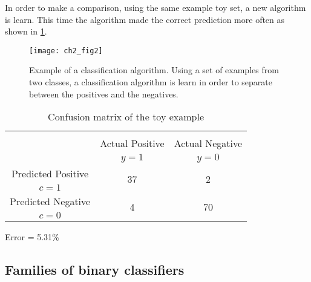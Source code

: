 	In order to make a comparison, using the same example toy set, a new algorithm is learn. This 
time the algorithm made the correct prediction more often as shown in \figurename{ \ref{fig:ch2:2}}.

\begin{figure}[t!]
	\centering
	\texttt{[image: ch2\_fig2]}
	\caption{Example of a classification algorithm. Using a set of examples from two classes, a 
	classification algorithm is learn in order to separate between the positives and the negatives. }
	\label{fig:ch2:2}
\end{figure}

    	\begin{table}[!t]
		\centering
		\footnotesize
    \begin{tabular}{c|c|c}
      \multicolumn{3}{c}{}\\
			\multicolumn{1}{c|}{}  & Actual Positive& Actual Negative \\
			\multicolumn{1}{c|}{} & $y=1$& $y=0$ \\
			\hline
			Predicted Positive 		& \multirow{ 2}{*}{37} & \multirow{ 
			2}{*}{2} \\
			$c=1$ & &\\
			\hline
			Predicted Negative  	& \multirow{ 2}{*}{4} & \multirow{ 
			2}{*}{70} \\
			$c=0$ & &\\
		\end{tabular}
		\caption{Confusion matrix of the toy example}
		\label{tab:ch2:2}
  \end{table}  
  Error = 5.31\%
  
\subsection{Families of binary classifiers}
